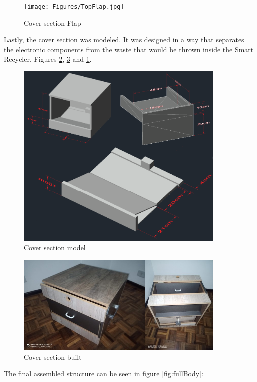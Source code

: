 \documentclass[a4paper,11pt]{article}
\begin{document}
\begin{figure}[H]
  \centering
  \texttt{[image: Figures/TopFlap.jpg]}
  \caption{\small{Cover section Flap}}
  \label{fig:coverModel3}
\end{figure}

Lastly, the cover section was modeled. It was designed in a way that separates the electronic components from the waste that would be thrown inside the Smart Recycler. Figures \ref{fig:coverModel1}, \ref{fig:coverModel2} and \ref{fig:coverModel3}.

\begin{figure}[H]
  \centering
  \includegraphics[width=10cm]{Figures/Cover Model.png}
  \caption{\small{Cover section model}}
  \label{fig:coverModel1}
\end{figure}

\begin{figure}[H]
  \centering
  \includegraphics[width=10cm]{Figures/Cover Built.png}
  \caption{\small{Cover section built}}
  \label{fig:coverModel2}
\end{figure}

The final assembled structure can be seen in figure \ref{fig:fullBody}:
\end{document}
